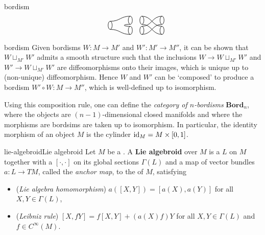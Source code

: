 \begin{example}{bordism}
\[        \quad
        \begin{tikzpicture}[semithick, scale=0.5, baseline=-0.5ex] \begin{scope} \draw (-1,0) ellipse (0.2cm and 0.4cm); \draw (1,0.5) ellipse (0.2cm and 0.4cm); \draw (1,-0.5) ellipse (0.2cm and 0.4cm); \draw (-1,0.4) .. controls (0,0.4) and (0,0.9) .. (1,0.9); \draw (-1,-0.4) .. controls (0,-0.4) and (0,-0.9) .. (1,-0.9); \draw (1,0.1) .. controls (0.2,0.1) and (0.2,-0.1) .. (1,-0.1); \end{scope} \end{tikzpicture}
        \quad
        \begin{tikzpicture}[semithick, scale=0.5, baseline=-0.5ex] \begin{scope} \draw (-1,0.5) ellipse (0.2cm and 0.4cm); \draw (-1,-0.5) ellipse (0.2cm and 0.4cm); \draw (1,0.5) ellipse (0.2cm and 0.4cm); \draw (1,-0.5) ellipse (0.2cm and 0.4cm); \draw (-1,0.9) .. controls (0,0.9) and (0,-0.1) .. (1,-0.1); \draw (-1,0.1) .. controls (0,0.1) and (0,-0.9) .. (1,-0.9); \draw (-1,-0.9) .. controls (0,-0.9) and (0,0.1) .. (1,0.1); \draw (-1,-0.1) .. controls (0,-0.1) and (0,0.9) .. (1,0.9); \end{scope} \end{tikzpicture} \]
\end{example}

\begin{example}{bordism}
    Given bordisms $W \colon M \to M'$ and $W' \colon M' \to M''$, it can be shown that $W \sqcup_{M'} W'$ admits a smooth structure such that the inclusions $W \to W \sqcup_{M'} W'$ and $W' \to W \sqcup_{M'} W'$ are diffeomorphisms onto their images, which is unique up to (non-unique) diffeomorphism. Hence $W$ and $W'$ can be `composed' to produce a bordism $W' \circ W \colon M \to M''$, which is well-defined up to isomorphism.
    
    Using this composition rule, one can define the \textit{category of $n$-bordisms} $\textbf{Bord}_n$, where the objects are $(n - 1)$-dimensional closed manifolds and where the morphisms are bordsims are taken up to isomorphism. In particular, the identity morphism of an object $M$ is the cylinder $\textup{id}_M = M \times [0, 1]$.
\end{example}

\begin{topic}{lie-algebroid}{Lie algebroid}
    Let $M$ be a . A \textbf{Lie algebroid} over $M$ is a  $L$ on $M$ together with a  $[\cdot, \cdot]$ on its global sections $\Gamma(L)$ and a map of vector bundles $a \colon L \to TM$, called the \textit{anchor map}, to the  of $M$, satisfying
    \begin{itemize}
        \item (\textit{Lie algebra homomorphism}) $a([X, Y]) = [a(X), a(Y)]$ for all $X, Y \in \Gamma(L)$,
        \item (\textit{Leibniz rule}) $[X, fY] = f[X, Y] + (a(X)  f) Y$ for all $X, Y \in \Gamma(L)$ and $f \in C^\infty(M)$.
    \end{itemize}
\end{topic}

